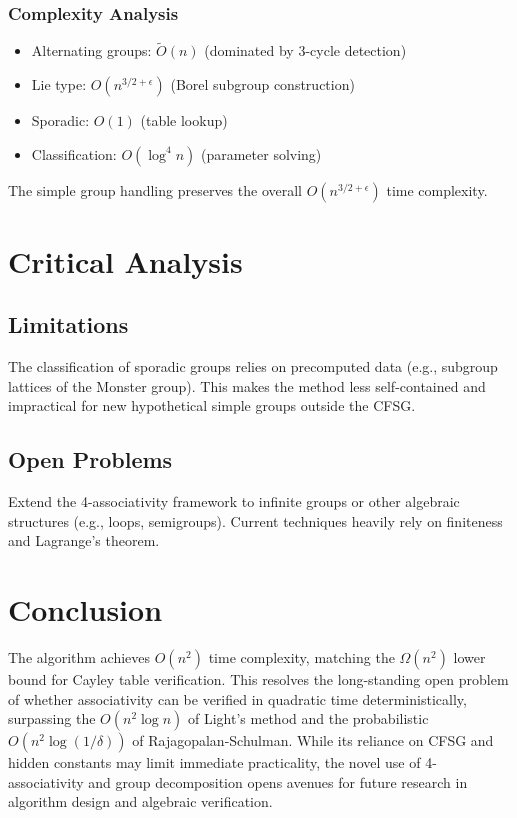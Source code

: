 \documentclass[sigconf]{acmart}
\begin{document}
\subsubsection{Complexity Analysis}
\begin{itemize}
    \item Alternating groups: $\widetilde{O}(n)$ (dominated by 3-cycle detection)
    \item Lie type: $O(n^{3/2+\epsilon})$ (Borel subgroup construction)
    \item Sporadic: $O(1)$ (table lookup)
    \item Classification: $O(\log^4 n)$ (parameter solving)
\end{itemize}

\begin{lemma}
The simple group handling preserves the overall $O(n^{3/2+\epsilon})$ time complexity.
\end{lemma}

\section{Critical Analysis}

\subsection{Limitations}

The classification of sporadic groups relies on precomputed data (e.g., subgroup lattices of the Monster group). This makes the method less self-contained and impractical for new hypothetical simple groups outside the CFSG.

\subsection{Open Problems}
Extend the 4-associativity framework to infinite groups or other algebraic structures (e.g., loops, semigroups). Current techniques heavily rely on finiteness and Lagrange's theorem.

\section{Conclusion}
The algorithm achieves $O(n^2)$ time complexity, matching the $\Omega(n^2)$ lower bound for Cayley table verification. This resolves the long-standing open problem of whether associativity can be verified in quadratic time deterministically, surpassing the $O(n^2 \log n)$ of Light's method and the probabilistic $O(n^2 \log(1/\delta))$ of Rajagopalan-Schulman. While its reliance on CFSG and hidden constants may limit immediate practicality, the novel use of 4-associativity and group decomposition opens avenues for future research in algorithm design and algebraic verification.



\end{document}
